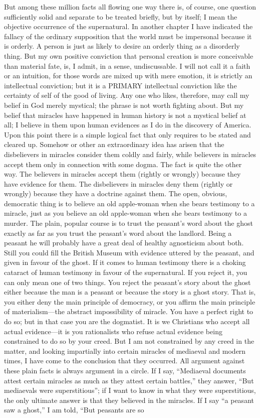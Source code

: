 But among these million facts all flowing one way there is, of course, one question sufficiently solid and separate to be treated briefly, but by itself; I mean the objective occurrence of the supernatural. In another chapter I have indicated the fallacy of the ordinary supposition that the world must be impersonal because it is orderly. A person is just as likely to desire an orderly thing as a disorderly thing. But my own positive conviction that personal creation is more conceivable than material fate, is, I admit, in a sense, undiscussable. I will not call it a faith or an intuition, for those words are mixed up with mere emotion, it is strictly an intellectual conviction; but it is a PRIMARY intellectual conviction like the certainty of self of the good of living. Any one who likes, therefore, may call my belief in God merely mystical; the phrase is not worth fighting about. But my belief that miracles have happened in human history is not a mystical belief at all; I believe in them upon human evidences as I do in the discovery of America. Upon this point there is a simple logical fact that only requires to be stated and cleared up. Somehow or other an extraordinary idea has arisen that the disbelievers in miracles consider them coldly and fairly, while believers in miracles accept them only in connection with some dogma. The fact is quite the other way. The believers in miracles accept them (rightly or wrongly) because they have evidence for them. The disbelievers in miracles deny them (rightly or wrongly) because they have a doctrine against them. The open, obvious, democratic thing is to believe an old apple-woman when she bears testimony to a miracle, just as you believe an old apple-woman when she bears testimony to a murder. The plain, popular course is to trust the peasant’s word about the ghost exactly as far as you trust the peasant’s word about the landlord. Being a peasant he will probably have a great deal of healthy agnosticism about both. Still you could fill the British Museum with evidence uttered by the peasant, and given in favour of the ghost. If it comes to human testimony there is a choking cataract of human testimony in favour of the supernatural. If you reject it, you can only mean one of two things. You reject the peasant’s story about the ghost either because the man is a peasant or because the story is a ghost story. That is, you either deny the main principle of democracy, or you affirm the main principle of materialism—the abstract impossibility of miracle. You have a perfect right to do so; but in that case you are the dogmatist. It is we Christians who accept all actual evidence—it is you rationalists who refuse actual evidence being constrained to do so by your creed. But I am not constrained by any creed in the matter, and looking impartially into certain miracles of mediaeval and modern times, I have come to the conclusion that they occurred. All argument against these plain facts is always argument in a circle. If I say, “Mediaeval documents attest certain miracles as much as they attest certain battles,” they answer, “But mediaevals were superstitious”; if I want to know in what they were superstitious, the only ultimate answer is that they believed in the miracles. If I say “a peasant saw a ghost,” I am told, “But peasants are so 